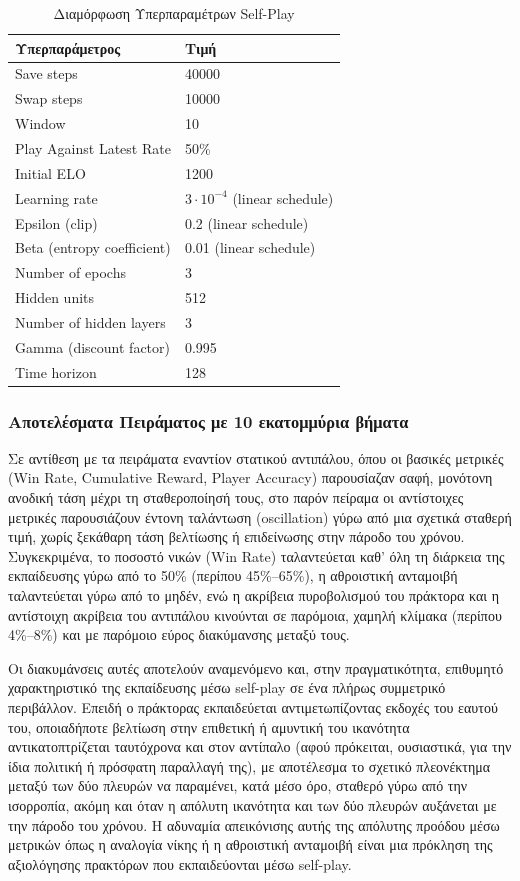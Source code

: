 \documentclass[12pt]{article}
\begin{document}
\begin{table}[H]
\centering
\caption{Διαμόρφωση Υπερπαραμέτρων Self-Play}
\label{tab:self-play-params}
\begin{tabular}{ll}
\hline
\textbf{Υπερπαράμετρος} & \textbf{Τιμή} \\
\hline
Save steps & 40000 \\
Swap steps & 10000 \\
Window & 10 \\
Play Against Latest Rate & 50\% \\
Initial ELO & 1200 \\
Learning rate & $3 \cdot 10^{-4}$ (linear schedule) \\
Epsilon (clip) & 0.2 (linear schedule) \\
Beta (entropy coefficient) & 0.01 (linear schedule) \\
Number of epochs & 3 \\
Hidden units & 512 \\
Number of hidden layers & 3 \\
Gamma (discount factor) & 0.995 \\
Time horizon & 128 \\
\hline
\end{tabular}
\end{table}

\subsubsection{Αποτελέσματα Πειράματος με 10 εκατομμύρια βήματα}
Σε αντίθεση με τα πειράματα εναντίον στατικού αντιπάλου, όπου οι βασικές μετρικές (Win Rate, Cumulative Reward, Player Accuracy) παρουσίαζαν σαφή, μονότονη ανοδική τάση μέχρι τη σταθεροποίησή τους, στο παρόν πείραμα οι αντίστοιχες μετρικές παρουσιάζουν έντονη ταλάντωση (oscillation) γύρω από μια σχετικά σταθερή τιμή, χωρίς ξεκάθαρη τάση βελτίωσης ή επιδείνωσης στην πάροδο του χρόνου. Συγκεκριμένα, το ποσοστό νικών (Win Rate) ταλαντεύεται καθ' όλη τη διάρκεια της εκπαίδευσης γύρω από το 50\% (περίπου 45\%–65\%), η αθροιστική ανταμοιβή ταλαντεύεται γύρω από το μηδέν, ενώ η ακρίβεια πυροβολισμού του πράκτορα και η αντίστοιχη ακρίβεια του αντιπάλου κινούνται σε παρόμοια, χαμηλή κλίμακα (περίπου 4\%–8\%) και με παρόμοιο εύρος διακύμανσης μεταξύ τους.

Οι διακυμάνσεις αυτές αποτελούν αναμενόμενο και, στην πραγματικότητα, επιθυμητό χαρακτηριστικό της εκπαίδευσης μέσω self-play σε ένα πλήρως συμμετρικό περιβάλλον. Επειδή ο πράκτορας εκπαιδεύεται αντιμετωπίζοντας εκδοχές του εαυτού του, οποιαδήποτε βελτίωση στην επιθετική ή αμυντική του ικανότητα αντικατοπτρίζεται ταυτόχρονα και στον αντίπαλο (αφού πρόκειται, ουσιαστικά, για την ίδια πολιτική ή πρόσφατη παραλλαγή της), με αποτέλεσμα το σχετικό πλεονέκτημα μεταξύ των δύο πλευρών να παραμένει, κατά μέσο όρο, σταθερό γύρω από την ισορροπία, ακόμη και όταν η απόλυτη ικανότητα και των δύο πλευρών αυξάνεται με την πάροδο του χρόνου. Η αδυναμία απεικόνισης αυτής της απόλυτης προόδου μέσω μετρικών όπως η αναλογία νίκης ή η αθροιστική ανταμοιβή είναι μια πρόκληση της αξιολόγησης πρακτόρων που εκπαιδεύονται μέσω self-play.
\end{document}
